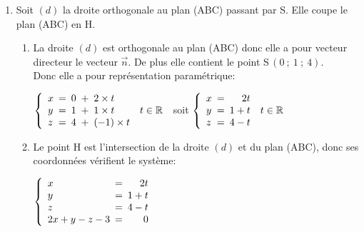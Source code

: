 \documentclass[10pt]{article}
\providecommand{\R}{\mathbb{R}}
\providecommand{\vect}[1]{\overrightarrow{#1}}
\providecommand{\vectt}[1]{\overrightarrow{\mathrm{#1}}}
\begin{document}
\begin{enumerate}
\begin{enumerate}
Le vecteur $\vect{n}$ est orthogonal aux deux vecteurs $\vectt{AB}$ et $\vectt{AC}$, donc il est orthogonal au plan (ABC).
				
		\item 
Le vecteur $\vect n$ est un vecteur normal au plan (ABC) donc le plan (ABC) a une équation cartésienne de la forme: $2x + 1y + (-1)z + d=0$ soit $2x+y-z=d=0$ où $d\in\R$.

$\text A \in \text{(ABC)}$ donc 	$2x_{\text A}+y_{\text A}-z_{\text A}+d=0$, c'est-à-dire $4 -1 +0 +d=0$, donc $d=-3$.
		
Le plan (ABC) a pour équation: $2x+y-z-3=0$.
		
		\item 
$2x_{\text S}+y_{\text S}-z_{\text S} - 3 = 0 + 1 -4 -3 = -6 \neq 0$ donc $\text S \not\in \text{(ABC)}$ 	donc  les points A, B, C et S ne sont pas coplanaires.	
		
	\end{enumerate}
	
\item  Soit $(d)$ la droite orthogonale au plan (ABC) passant par S. Elle coupe le plan (ABC) en H.
	\begin{enumerate}
		\item 
La droite $(d)$ est orthogonale au plan (ABC) donc elle a pour vecteur directeur le vecteur $\vect n$. De plus elle contient le point S\,$(0~;~1~;~4)$. \\
Donc elle a pour représentation paramétrique:

$\left \lbrace
\begin{array}{l !{=} l !{+} l l}
x & 0 & 2\times t\\
y & 1& 1\times t & t\in\R\\
z & 4 &(-1)\times t
\end{array}
\right .$
soit 
$\left \lbrace
\begin{array}{l !{=} r l}
x & 2t\\
y & 1+t & t\in\R\\
z & 4 - t
\end{array}
\right .$		
		
		\item 
Le point H est l'intersection de la droite $(d)$ et du plan (ABC), donc ses coordonnées vérifient le système:

$\left \lbrace
\begin{array}{l !{=} r}
x & 2t\\
y & 1+t \\
z & 4 - t\\
2x+y-z-3 & 0
\end{array}
\right .$			
		

\end{enumerate}
\end{enumerate}
\end{document}
